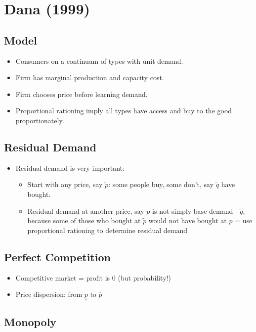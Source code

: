 \section{Dana (1999)}

\subsection{Model}

\begin{itemize}
\item Consumers on a continuum of types with unit demand.
\item Firm has marginal production and capacity cost.
\item Firm chooses price before learning demand.
\item Proportional rationing imply all types have access and buy to the good proportionately.
\end{itemize}

\subsection{Residual Demand}

\begin{itemize}
\item Residual demand is very important:
\begin{itemize}
\item Start with any price, say $\tilde p$: some people buy, some don't, say $\tilde q$ have bought.
\item Residual demand at another price, say $p$ is not simply base demand - $\tilde q$, because some of those who bought at $\tilde p$ would not have bought at $p$ = use proportional rationing to determine residual demand
\end{itemize}
\end{itemize}

\subsection{Perfect Competition}

\begin{itemize}
\item Competitive market = profit is 0 (but probability!)
\item Price dispersion: from $\underline{p}$ to $\bar p$
\end{itemize}

\subsection{Monopoly}

